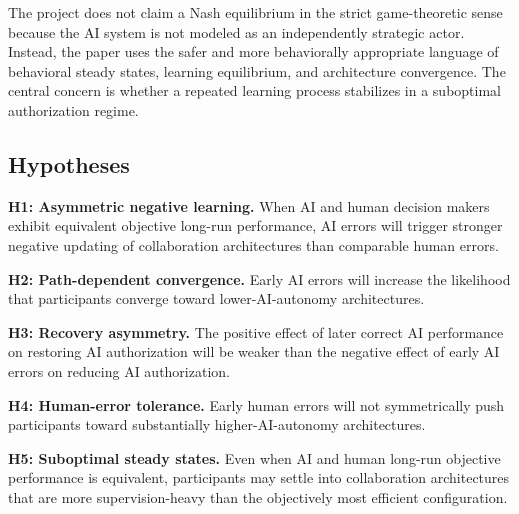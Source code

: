 The project does not claim a Nash equilibrium in the strict game-theoretic sense because the AI system is not modeled as an independently strategic actor. Instead, the paper uses the safer and more behaviorally appropriate language of behavioral steady states, learning equilibrium, and architecture convergence. The central concern is whether a repeated learning process stabilizes in a suboptimal authorization regime.

\subsection{Hypotheses}

\textbf{H1: Asymmetric negative learning.} When AI and human decision makers exhibit equivalent objective long-run performance, AI errors will trigger stronger negative updating of collaboration architectures than comparable human errors.

\textbf{H2: Path-dependent convergence.} Early AI errors will increase the likelihood that participants converge toward lower-AI-autonomy architectures.

\textbf{H3: Recovery asymmetry.} The positive effect of later correct AI performance on restoring AI authorization will be weaker than the negative effect of early AI errors on reducing AI authorization.

\textbf{H4: Human-error tolerance.} Early human errors will not symmetrically push participants toward substantially higher-AI-autonomy architectures.

\textbf{H5: Suboptimal steady states.} Even when AI and human long-run objective performance is equivalent, participants may settle into collaboration architectures that are more supervision-heavy than the objectively most efficient configuration.
